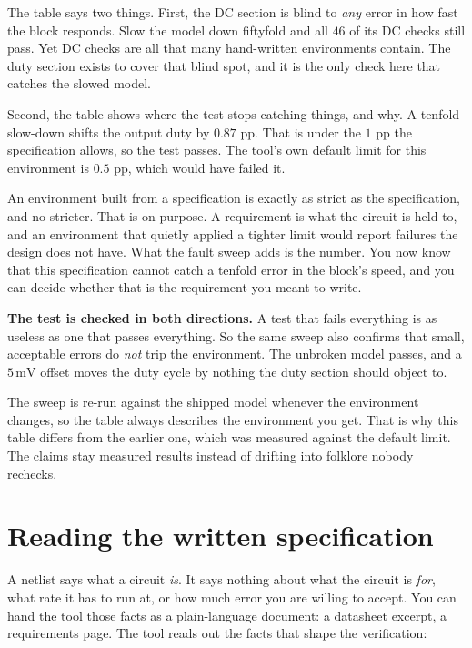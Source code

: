 \documentclass[11pt,a4paper]{article}
\newcommand{\unit}[1]{\,\textrm{#1}}
\begin{document}
\noindent The table says two things. First, the DC section is blind
to \emph{any} error in how fast the block responds. Slow the model
down fiftyfold and all $46$ of its DC checks still pass. Yet DC checks
are all that many hand-written environments contain. The duty section
exists to cover that blind spot, and it is the only check here that
catches the slowed model.

Second, the table shows where the test stops catching things, and why.
A tenfold slow-down shifts the output duty by $0.87$ pp. That is under
the $1$ pp the specification allows, so the test passes. The tool's
own default limit for this environment is $0.5$ pp, which would have
failed it.

An environment built from a specification is exactly as strict as the
specification, and no stricter. That is on purpose. A requirement is
what the circuit is held to, and an environment that quietly applied a
tighter limit would report failures the design does not have. What the
fault sweep adds is the number. You now know that this specification
cannot catch a tenfold error in the block's speed, and you can decide
whether that is the requirement you meant to write.

\textbf{The test is checked in both directions.} A test that fails
everything is as useless as one that passes everything. So the same
sweep also confirms that small, acceptable errors do \emph{not} trip
the environment. The unbroken model passes, and a $5\unit{mV}$ offset
moves the duty cycle by nothing the duty section should object to.

The sweep is re-run against the shipped model whenever the environment
changes, so the table always describes the environment you get. That
is why this table differs from the earlier one, which was measured
against the default limit. The claims stay measured results instead of
drifting into folklore nobody rechecks.

\section{Reading the written specification}
\label{sec:spec}

A netlist says what a circuit \emph{is}. It says nothing about what
the circuit is \emph{for}, what rate it has to run at, or how much
error you are willing to accept. You can hand the tool those facts as
a plain-language document: a datasheet excerpt, a requirements page.
The tool reads out the facts that shape the verification:
\end{document}
